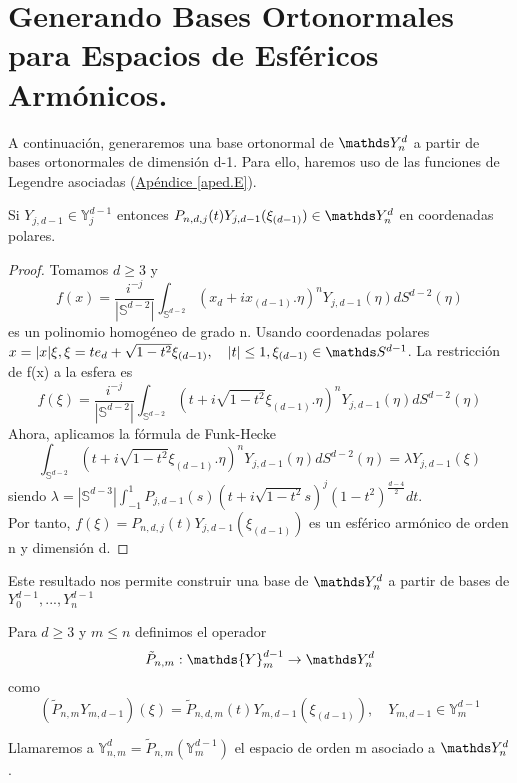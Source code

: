 \section{Generando Bases Ortonormales para Espacios de Esféricos Armónicos.}
A continuación, generaremos una base ortonormal de $\spharm$ a partir de bases ortonormales de dimensión d-1. Para ello, haremos uso de las funciones de Legendre asociadas (\hyperref[]{Apéndice \ref{aped.E}}).

\medskip

\begin{prop}Si $Y_{j,d-1}\in\mathds{Y}_j^{d-1}$ entonces $P_{n,d,j}(t)Y_{j,d-1}(\xi_{(d-1)})\in\spharm$ en coordenadas polares.
\end{prop}
\begin{proof}
	
	Tomamos $d\ge3$ y 
	$$
	f(x) = \frac{i^{-j}}{|\mathds{S}^{d-2}|}\int_{\mathds{S}^{d-2}} (x_d+ix_{(d-1)}.\eta)^n Y_{j,d-1}(\eta) d{S}^{d-2}(\eta)
	$$
	es un polinomio homogéneo de grado n. Usando coordenadas polares $x = |x|\xi, \xi= te_d + \sqrt{1-t^2}\xi_{(d-1)}, \quad |t|\le 1, \xi_{(d-1)}\in \sphere$. 
	La restricción de f(x) a la esfera es
	$$
	f(\xi) =  \frac{i^{-j}}{|\mathds{S}^{d-2}|}\int_{\mathds{S}^{d-2}} (t+i\sqrt{1-t^2}\xi_{(d-1)}.\eta)^n Y_{j,d-1}(\eta) dS^{d-2}(\eta)
		$$
		Ahora, aplicamos la fórmula de Funk-Hecke 
		$$
		\int_{\mathds{S}^{d-2}} (t+i\sqrt{1-t^2}\xi_{(d-1)}.\eta)^n Y_{j,d-1}(\eta) dS^{d-2}(\eta) = \lambda  Y_{j,d-1}(\xi)
			$$ 
			siendo $\lambda = |\mathds{S}^{d-3}|\int_{-1}^{1} P_{j,d-1}(s)(t+i\sqrt{1-t^2}s)^j(1-t^2)^{\frac{d-4}{2}}dt$.\\
			
			Por tanto, $f(\xi) = P_{n,d,j}(t)Y_{j,d-1}(\xi_{(d-1)})$ es un esférico armónico de orden n y dimensión d.
\end{proof}
Este resultado nos permite construir una base de $\spharm$ a partir de bases de $Y_{0}^{d-1},...,Y_{n}^{d-1}$
\begin{defn}
Para $d\ge3$ y $m\le n$ definimos el operador $$ \tilde{P}_{n,m} : \mathds{Y}_m^{d-1} \to \spharm
$$
como
$$
(\tilde{P}_{n,m}Y_{m,d-1})(\xi) = \tilde{P}_{n,d,m}(t)Y_{m,d-1}(\xi_{(d-1)}), \quad Y_{m,d-1} \in \mathds{Y}_m^{d-1}
$$
\end{defn}
Llamaremos a $\mathds{Y}^d_{n,m} = \tilde{P}_{n,m}(\mathds{Y}_{m}^{d-1})$  el espacio de orden m asociado a $\spharm$. \medskip

